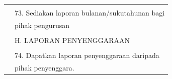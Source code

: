 \documentclass[
]{article}
\begin{document}
\begin{longtable}[]{@{}ll@{}}
\begin{minipage}[t]{0.23\columnwidth}
\strut
\end{minipage} & \begin{minipage}[t]{0.71\columnwidth}\raggedright
\strut
\end{minipage}\tabularnewline
\begin{minipage}[t]{0.23\columnwidth}\raggedright
\strut
\end{minipage} & \begin{minipage}[t]{0.71\columnwidth}\raggedright
73. Sediakan laporan bulanan/sukutahunan bagi\strut
\end{minipage}\tabularnewline
\begin{minipage}[t]{0.23\columnwidth}\raggedright
\strut
\end{minipage} & \begin{minipage}[t]{0.71\columnwidth}\raggedright
pihak pengurusan\strut
\end{minipage}\tabularnewline
\begin{minipage}[t]{0.23\columnwidth}\raggedright
\strut
\end{minipage} & \begin{minipage}[t]{0.71\columnwidth}\raggedright
\strut
\end{minipage}\tabularnewline
\begin{minipage}[t]{0.23\columnwidth}\raggedright
\strut
\end{minipage} & \begin{minipage}[t]{0.71\columnwidth}\raggedright
H. LAPORAN PENYENGGARAAN\strut
\end{minipage}\tabularnewline
\begin{minipage}[t]{0.23\columnwidth}\raggedright
\strut
\end{minipage} & \begin{minipage}[t]{0.71\columnwidth}\raggedright
\strut
\end{minipage}\tabularnewline
\begin{minipage}[t]{0.23\columnwidth}\raggedright
\strut
\end{minipage} & \begin{minipage}[t]{0.71\columnwidth}\raggedright
74. Dapatkan laporan penyenggaraan daripada\strut
\end{minipage}\tabularnewline
\begin{minipage}[t]{0.23\columnwidth}\raggedright
\strut
\end{minipage} & \begin{minipage}[t]{0.71\columnwidth}\raggedright
pihak penyenggara.\strut
\end{minipage}\tabularnewline

\end{longtable}
\end{document}
